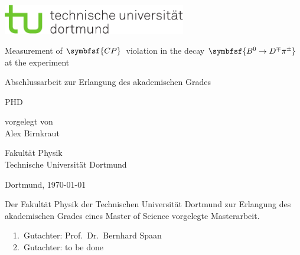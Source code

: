
\begin{titlepage}
\includegraphics[width=8cm]{tud-logo-cmyk.pdf}
\vspace*{15ex}
{%
\Huge \sffamily \bfseries
\begin{center}
Measurement of $\symbfsf{C{}P}$\, violation in the decay $\symbfsf{\Bz\to D^\mp\pi^\pm}$ at the \lhcb experiment
\end{center}
}%

\begin{otherlanguage}{german}
{%
\LARGE \sffamily %
\begin{center}
Abschlussarbeit zur Erlangung des akademischen Grades\\
\end{center}
}

{%
\LARGE \sffamily %
\begin{center}
PHD
\end{center}
}

\vspace{5ex}


{%
\Large \sffamily
\begin{center}
vorgelegt von \\[0.8ex]
Alex Birnkraut
\end{center}
}
\vspace{5ex}
{%
\Large \sffamily
\begin{center}
Fakultät Physik\\
Technische Universität Dortmund
\end{center}
}
\vspace{4ex}
{%
\Large \sffamily
\begin{center}
Dortmund, \today
\end{center}
}

\clearpage
\thispagestyle{empty}
\vspace*{\fill}
\noindent Der Fakultät Physik der Technischen Universität Dortmund zur Erlangung
des akademischen Grades eines Master of Science vorgelegte
Masterarbeit.\\

\parbox{\textwidth}{
  1.~Gutachter: Prof.~Dr.~Bernhard Spaan \\
  2.~Gutachter: to be done\\
}
\end{otherlanguage}
\end{titlepage}
\setcounter{page}{1}
